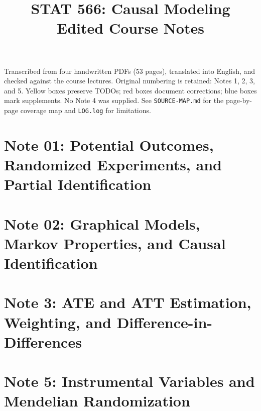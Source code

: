 
\title{STAT 566: Causal Modeling\\[.4em]\large Edited Course Notes}

\maketitle
\begin{remarkbox}
Transcribed from four handwritten PDFs (53 pages), translated into English, and checked against the course lectures. Original numbering is retained: Notes 1, 2, 3, and 5. Yellow boxes preserve TODOs; red boxes document corrections; blue boxes mark supplements. No Note 4 was supplied. See \texttt{SOURCE-MAP.md} for the page-by-page coverage map and \texttt{LOG.log} for limitations.
\end{remarkbox}
\tableofcontents
\clearpage
\part{Note 01: Potential Outcomes, Randomized Experiments, and Partial Identification}

\clearpage
\part{Note 02: Graphical Models, Markov Properties, and Causal Identification}

\clearpage
\part{Note 3: ATE and ATT Estimation, Weighting, and Difference-in-Differences}

\clearpage
\part{Note 5: Instrumental Variables and Mendelian Randomization}


